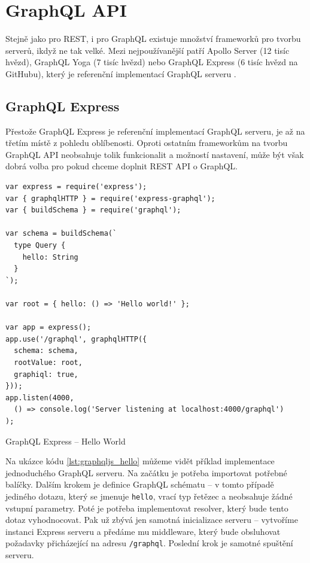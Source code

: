 \documentclass[thesis=M,czech]{FITthesis}[2019/12/23]
\begin{document}
\section{GraphQL API}
Stejně jako pro REST, i pro GraphQL existuje množství frameworků pro tvorbu serverů, ikdyž ne tak velké. Mezi nejpoužívanější patří Apollo Server (12 tisíc hvězd), GraphQL Yoga (7 tisíc hvězd) nebo GraphQL Express (6 tisíc hvězd na GitHubu), který je referenční implementací GraphQL serveru \cite{graphql_libraries}.

\subsection*{GraphQL Express}
Přestože GraphQL Express je referenční implementací GraphQL serveru, je až na třetím místě z pohledu oblíbenosti. Oproti ostatním frameworkům na tvorbu GraphQL API neobsahuje tolik funkcionalit a možností nastavení, může být však dobrá volba pro pokud chceme doplnit REST API o GraphQL.

\begin{listing}[H]
\begin{verbatim}
var express = require('express');
var { graphqlHTTP } = require('express-graphql');
var { buildSchema } = require('graphql');

var schema = buildSchema(`
  type Query {
    hello: String
  }
`);

var root = { hello: () => 'Hello world!' };

var app = express();
app.use('/graphql', graphqlHTTP({
  schema: schema,
  rootValue: root,
  graphiql: true,
}));
app.listen(4000, 
  () => console.log('Server listening at localhost:4000/graphql')
);
\end{verbatim}
\caption{GraphQL Express -- Hello World}
\label{lst:graphqljs_hello}
\end{listing}

Na ukázce kódu \ref{lst:graphqljs_hello} můžeme vidět příklad implementace jednoduchého GraphQL serveru. Na začátku je potřeba importovat potřebné balíčky. Dalším krokem je definice GraphQL schématu -- v tomto případě jediného dotazu, který se jmenuje \texttt{hello}, vrací typ řetězec a neobsahuje žádné vstupní parametry. Poté je potřeba implementovat resolver, který bude tento dotaz vyhodnocovat. Pak už zbývá jen samotná inicializace serveru -- vytvoříme instanci Express serveru a předáme mu middleware, který bude obsluhovat požadavky přicházející na adresu \texttt{/graphql}. Poslední krok je samotné spuštění serveru.
\end{document}
